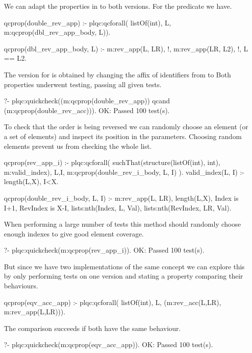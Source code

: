 We can adapt the properties in  to both versions.
%
%
For the  predicate we have.
\begin{yapcode}
 qcprop(double_rev_app) :-
   plqc:qcforall( listOf(int), L, m:qcprop({dbl_rev_app_body, L})).

 qcprop({dbl_rev_app_body, L}) :- 
   m:rev_app(L, LR), !, m:rev_app(LR, L2), !, L == L2.
\end{yapcode}
%
The version for  is obtained by changing the affix of
identifiers from  to 
%
Both properties underwent testing, passing all given tests.
%
\begin{yapcode}
   ?- plqc:quickcheck((m:qcprop(double_rev_app))
                 qcand (m:qcprop(double_rev_acc))).
 OK: Passed 100 test(s).
\end{yapcode}

To check that the order is being reversed we can randomly choose an
element (or a %
 set of elements) and inspect
 its position in the parameters.
%
Choosing random elements prevent us from checking the whole list.
%
\begin{yapcode}
 qcprop(rev_app_i) :- plqc:qcforall(
     suchThat(structure({listOf(int), int}), m:valid_index),
     {L,I}, m:qcprop({double_rev_i_body, L, I}) ).
 valid_index({L, I}) :- length(L,X), I<X.

 qcprop({double_rev_i_body, L, I}) :- 
   m:rev_app(L, LR), length(L,X), Index is I+1, RevIndex is X-I,
   lists:nth(Index, L, Val), lists:nth(RevIndex, LR, Val).
\end{yapcode}
%
When performing a large number of tests this method should
 randomly choose enough indexes to 
give good
element coverage.
%
\begin{yapcode}
   ?- plqc:quickcheck(m:qcprop(rev_app_i)).
 OK: Passed 100 test(s).
\end{yapcode}


But since we have two implementations of the same concept we can explore
this by only performing tests on one version and stating a property
comparing their behaviours.
%
\begin{yapcode}
 qcprop(eqv_acc_app) :-
   plqc:qcforall( listOf(int), L, (m:rev_acc(L,LR), m:rev_app(L,LR))).
\end{yapcode}
The comparison succeeds if both have the same behaviour.
%
\begin{yapcode}
   ?- plqc:quickcheck(m:qcprop(eqv_acc_app)).
 OK: Passed 100 test(s).
\end{yapcode}

